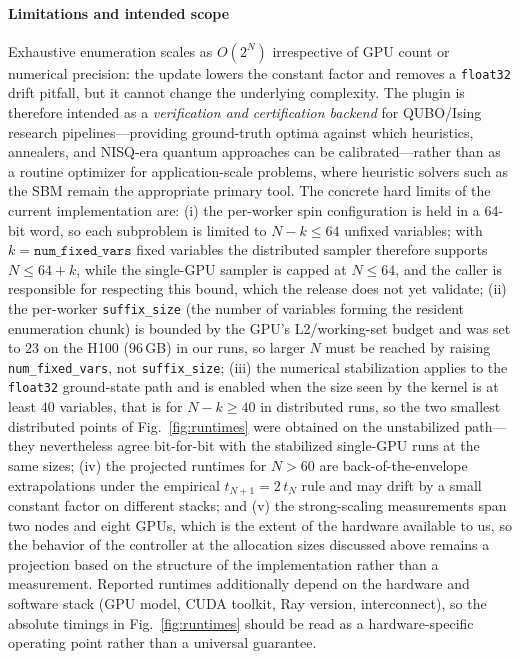 \documentclass[preprint,12pt,a4paper]{elsarticle}
\begin{document}
\paragraph{Limitations and intended scope}
Exhaustive enumeration scales as $O(2^N)$ irrespective of GPU count or
numerical precision: the update lowers the constant factor and removes a
\texttt{float32} drift pitfall, but it cannot change the underlying
complexity. The plugin is therefore intended as a \emph{verification and
certification backend} for QUBO/Ising research pipelines---providing
ground-truth optima against which heuristics, annealers, and NISQ-era
quantum approaches can be calibrated---rather than as a routine optimizer
for application-scale problems, where heuristic solvers such as the SBM
remain the appropriate primary tool. The concrete hard limits of the current
implementation are: (i) the per-worker spin configuration is held in a 64-bit
word, so each subproblem is limited to $N-k \leq 64$ unfixed variables; with
$k=\texttt{num\_fixed\_vars}$ fixed variables the distributed sampler therefore
supports $N \leq 64+k$, while the single-GPU sampler is capped at $N \leq 64$,
and the caller is responsible for respecting this bound, which the release does
not yet validate; (ii) the per-worker \texttt{suffix\_size} (the number of
variables forming the resident enumeration chunk) is bounded by the GPU's
L2/working-set budget and was set to $23$ on the H100 (96\,GB) in our runs, so
larger $N$ must be reached by raising \texttt{num\_fixed\_vars}, not
\texttt{suffix\_size}; (iii) the numerical stabilization applies to the
\texttt{float32} ground-state path and is enabled when the size seen by the
kernel is at least $40$ variables, that is for $N-k \geq 40$ in distributed
runs, so the two smallest distributed points of Fig.~\ref{fig:runtimes} were
obtained on the unstabilized path---they nevertheless agree bit-for-bit with the
stabilized single-GPU runs at the same sizes; (iv) the projected runtimes
for $N > 60$ are back-of-the-envelope extrapolations under the empirical
$t_{N+1}=2\,t_N$ rule and may drift by a small constant factor on different
stacks; and (v) the strong-scaling measurements span two nodes and eight GPUs,
which is the extent of the hardware available to us, so the behavior of the
controller at the allocation sizes discussed above remains a projection based on
the structure of the implementation rather than a measurement. Reported runtimes
additionally depend on the hardware and software stack (GPU model, CUDA
toolkit, Ray version, interconnect), so the absolute timings in
Fig.~\ref{fig:runtimes} should be read as a hardware-specific operating
point rather than a universal guarantee.
\end{document}

